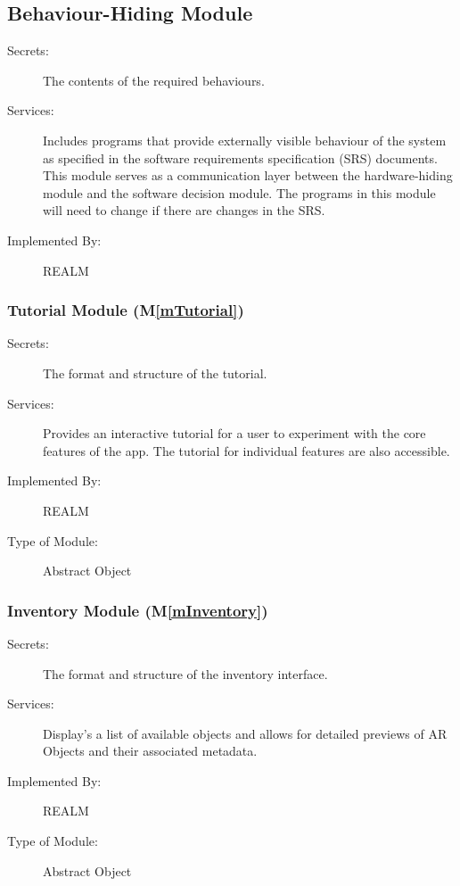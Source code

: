 \documentclass[12pt, titlepage]{article}
\newcommand{\mref}[1]{M\ref{#1}}
\begin{document}
\subsection{Behaviour-Hiding Module}

\begin{description}
\item[Secrets:]The contents of the required behaviours.
\item[Services:]Includes programs that provide externally visible behaviour of
  the system as specified in the software requirements specification (SRS)
  documents. This module serves as a communication layer between the
  hardware-hiding module and the software decision module. The programs in this
  module will need to change if there are changes in the SRS.
\item[Implemented By:] REALM
\end{description}


\subsubsection{Tutorial Module (\mref{mTutorial})}

\begin{description}
\item[Secrets:]The format and structure of the tutorial.
\item[Services:]Provides an interactive tutorial for a user to experiment with the core features of the app. The tutorial for individual features are also accessible.
\item[Implemented By:]REALM
\item[Type of Module:]Abstract Object
\end{description}

\subsubsection{Inventory Module (\mref{mInventory})}

\begin{description}
\item[Secrets:]The format and structure of the inventory interface.
\item[Services:]Display's a list of available objects and allows for detailed previews of AR Objects and their associated metadata.
\item[Implemented By:]REALM
\item[Type of Module:]Abstract Object
\end{description}
\end{document}
